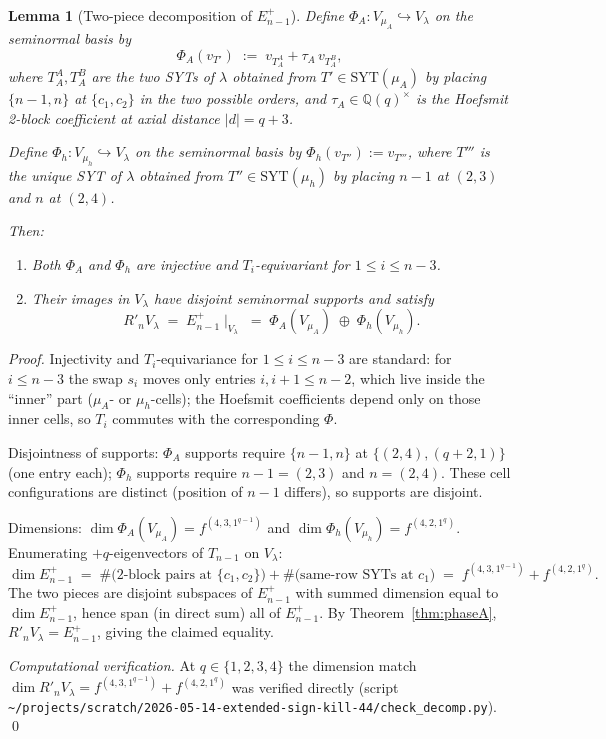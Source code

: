 \documentclass[11pt]{article}
\newtheorem{lemma}[theorem]{Lemma}
\theoremstyle{definition}
\newcommand{\SYT}{\mathrm{SYT}}
\newcommand{\Rp}{{R'}}
\begin{document}
\begin{lemma}[Two-piece decomposition of $E_{n-1}^+$]\label{lem:Eplus-decomp}
Define $\Phi_A : V_{\mu_A} \hookrightarrow V_\lambda$ on the
seminormal basis by
\[
   \Phi_A(v_{T'}) \;:=\; v_{T_A^A} + \tau_A\,v_{T_A^B},
\]
where $T_A^A, T_A^B$ are the two SYTs of $\lambda$ obtained from
$T' \in \SYT(\mu_A)$ by placing $\{n-1, n\}$ at $\{c_1, c_2\}$ in the
two possible orders, and $\tau_A \in \mathbb{Q}(q)^\times$ is the
Hoefsmit 2-block coefficient at axial distance $|d| = q+3$.

Define $\Phi_h : V_{\mu_h} \hookrightarrow V_\lambda$ on the seminormal
basis by $\Phi_h(v_{T''}) := v_{T'''}$, where $T'''$ is the unique
SYT of $\lambda$ obtained from $T'' \in \SYT(\mu_h)$ by placing $n-1$
at $(2, 3)$ and $n$ at $(2, 4)$.

Then:
\begin{enumerate}[topsep=0.3em,itemsep=0.1em,leftmargin=2em,
                  label=(\roman*)]
\item Both $\Phi_A$ and $\Phi_h$ are injective and $T_i$-equivariant
   for $1 \le i \le n-3$.
\item Their images in $V_\lambda$ have disjoint seminormal supports
   and satisfy
   \[
       \Rp_n V_\lambda \;=\; E_{n-1}^+\!\mid_{V_\lambda}
       \;=\; \Phi_A(V_{\mu_A}) \;\oplus\; \Phi_h(V_{\mu_h}).
   \]
\end{enumerate}
\end{lemma}

\begin{proof}
Injectivity and $T_i$-equivariance for $1 \le i \le n-3$ are
standard: for $i \le n-3$ the swap $s_i$ moves only entries $i, i+1
\le n - 2$, which live inside the ``inner'' part ($\mu_A$- or
$\mu_h$-cells); the Hoefsmit coefficients depend only on those
inner cells, so $T_i$ commutes with the corresponding $\Phi$.

Disjointness of supports: $\Phi_A$ supports require $\{n-1, n\}$ at
$\{(2, 4), (q+2, 1)\}$ (one entry each); $\Phi_h$ supports require
$n-1 = (2, 3)$ and $n = (2, 4)$.  These cell configurations are
distinct (position of $n-1$ differs), so supports are disjoint.

Dimensions: $\dim \Phi_A(V_{\mu_A}) = f^{(4, 3, 1^{q-1})}$ and
$\dim \Phi_h(V_{\mu_h}) = f^{(4, 2, 1^q)}$.  Enumerating $+q$-eigenvectors
of $T_{n-1}$ on $V_\lambda$:
\[
   \dim E_{n-1}^+ \;=\; \#\bigl(\text{2-block pairs at }\{c_1, c_2\}\bigr)
   + \#\bigl(\text{same-row SYTs at }c_1\bigr)
   \;=\; f^{(4, 3, 1^{q-1})} + f^{(4, 2, 1^q)}.
\]
The two pieces are disjoint subspaces of $E_{n-1}^+$ with summed
dimension equal to $\dim E_{n-1}^+$, hence span (in direct sum) all
of $E_{n-1}^+$.  By Theorem~\ref{thm:phaseA},
$\Rp_n V_\lambda = E_{n-1}^+$, giving the claimed equality.

\emph{Computational verification.}  At $q \in \{1, 2, 3, 4\}$ the
dimension match
$\dim \Rp_n V_\lambda = f^{(4,3,1^{q-1})} + f^{(4,2,1^q)}$
was verified directly
(script \texttt{\textasciitilde/projects/scratch/2026-05-14-extended-sign-kill-44/check\_decomp.py}).
\qed
\end{proof}
\end{document}
